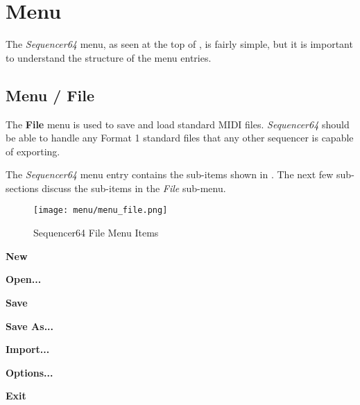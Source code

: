 %
%
%

\section{Menu}
\label{sec:seq64_menu}

   The \textsl{Sequencer64} menu, as seen at the top of
   ,
   is fairly simple, but it is important to understand the
   structure of the menu entries.

\subsection{Menu / File}
\label{subsec:seq64_menu_file}

   The \textbf{File} menu is used to save and load standard MIDI files.
   \textsl{Sequencer64}
   should be able to handle any Format 1 standard files that any other
   sequencer is capable of exporting.  

   The \textsl{Sequencer64} menu entry contains the sub-items shown in
   .  The next few sub-sections discuss
   the sub-items in the \textsl{File} sub-menu.

\begin{figure}[H]
   \centering 
   \texttt{[image: menu/menu\_file.png]}
   \caption{Sequencer64 File Menu Items}
   \label{fig:seq64_menu_file_items}
\end{figure}

   \begin{enumber}
      \item \textbf{New}
      \item \textbf{Open...}
      \item \textbf{Save}
      \item \textbf{Save As...}
      \item \textbf{Import...}
      \item \textbf{Options...}
      \item \textbf{Exit}
   \end{enumber}

